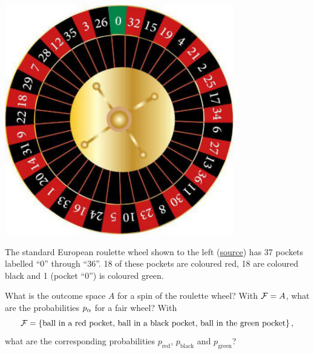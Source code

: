 \begin{minipage}{0.4\textwidth}
  \includegraphics[width=0.75\textwidth]{figs/roulette.pdf}
\end{minipage}%
\begin{minipage}{0.5\textwidth}
  The standard European roulette wheel shown to the left (\href{https://www.vecteezy.com/vector-art/658761-casino-roulette-wheel}{source}) has 37 pockets labelled ``0'' through ``36''.
  18 of these pockets are coloured red, 18 are coloured black and 1 (pocket ``0'') is coloured green.
\end{minipage}

\noindent What is the outcome space $A$ for a spin of the roulette wheel?
With $\mathcal F = A$, what are the probabilities $p_{\alpha}$ for a fair wheel?
With
\begin{equation*}
  \mathcal F = \left\{\mbox{ball in a red pocket, ball in a black pocket, ball in the green pocket}\right\},
\end{equation*}
what are the corresponding probabilities $p_{\text{red}}$, $p_{\text{black}}$ and $p_{\text{green}}$?
\begin{mdframed}
  \ \\[100 pt]
\end{mdframed}

